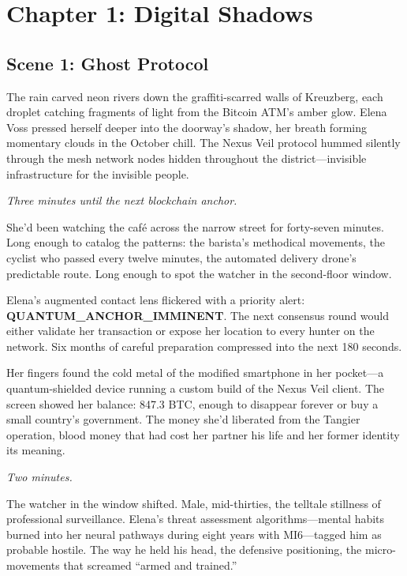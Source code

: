 \hypertarget{chapter-1-digital-shadows}{%
\section{Chapter 1: Digital Shadows}\label{chapter-1-digital-shadows}}

\hypertarget{scene-1-ghost-protocol}{%
\subsection{Scene 1: Ghost Protocol}\label{scene-1-ghost-protocol}}

The rain carved neon rivers down the graffiti-scarred walls of Kreuzberg, each droplet catching fragments of light from the Bitcoin ATM's amber glow. Elena Voss pressed herself deeper into the doorway's shadow, her breath forming momentary clouds in the October chill. The Nexus Veil protocol hummed silently through the mesh network nodes hidden throughout the district---invisible infrastructure for the invisible people.

\emph{Three minutes until the next blockchain anchor.}

She'd been watching the café across the narrow street for forty-seven minutes. Long enough to catalog the patterns: the barista's methodical movements, the cyclist who passed every twelve minutes, the automated delivery drone's predictable route. Long enough to spot the watcher in the second-floor window.

Elena's augmented contact lens flickered with a priority alert: \textbf{QUANTUM\_ANCHOR\_IMMINENT}. The next consensus round would either validate her transaction or expose her location to every hunter on the network. Six months of careful preparation compressed into the next 180 seconds.

Her fingers found the cold metal of the modified smartphone in her pocket---a quantum-shielded device running a custom build of the Nexus Veil client. The screen showed her balance: 847.3 BTC, enough to disappear forever or buy a small country's government. The money she'd liberated from the Tangier operation, blood money that had cost her partner his life and her former identity its meaning.

\emph{Two minutes.}

The watcher in the window shifted. Male, mid-thirties, the telltale stillness of professional surveillance. Elena's threat assessment algorithms---mental habits burned into her neural pathways during eight years with MI6---tagged him as probable hostile. The way he held his head, the defensive positioning, the micro-movements that screamed ``armed and trained.''

